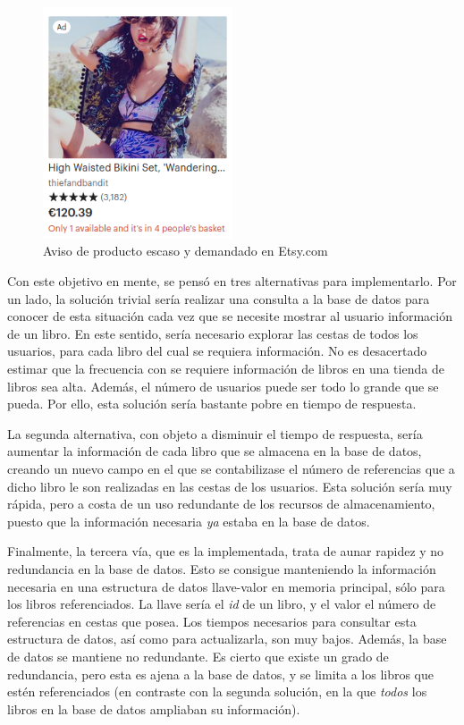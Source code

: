\documentclass[a4paper]{article}
\begin{document}
    \begin{figure}[htb!]
    	\centering
    	\includegraphics[width=0.5\textwidth]{etsy}
    	\caption{Aviso de producto escaso y demandado en Etsy.com}
    	\label{fig:etsy}
    \end{figure}
    
    Con este objetivo en mente, se pensó en tres alternativas para implementarlo. Por un lado, la solución trivial sería realizar una consulta a la base de datos para conocer de esta situación cada vez que se necesite mostrar al usuario información de un libro. En este sentido, sería necesario explorar las cestas de todos los usuarios, para cada libro del cual se requiera información. No es desacertado estimar que la frecuencia con se requiere información de libros en una tienda de libros sea alta. Además, el número de usuarios puede ser todo lo grande que se pueda. Por ello, esta solución sería bastante pobre en tiempo de respuesta.
    
    La segunda alternativa, con objeto a disminuir el tiempo de respuesta, sería aumentar la información de cada libro que se almacena en la base de datos, creando un nuevo campo en el que se contabilizase el número de referencias que a dicho libro le son realizadas en las cestas de los usuarios. Esta solución sería muy rápida, pero a costa de un uso redundante de los recursos de almacenamiento, puesto que la información necesaria \emph{ya} estaba en la base de datos.
    
    Finalmente, la tercera vía, que es la implementada, trata de aunar rapidez y no redundancia en la base de datos. Esto se consigue manteniendo la información necesaria en una estructura de datos llave-valor en memoria principal, sólo para los libros referenciados. La llave sería el \emph{id} de un libro, y el valor el número de referencias en cestas que posea. Los tiempos necesarios para consultar esta estructura de datos, así como para actualizarla, son muy bajos. Además, la base de datos se mantiene no redundante. Es cierto que existe un grado de redundancia, pero esta es ajena a la base de datos, y se limita a los libros que estén referenciados (en contraste con la segunda solución, en la que \emph{todos} los libros en la base de datos ampliaban su información).
    
\end{document}
